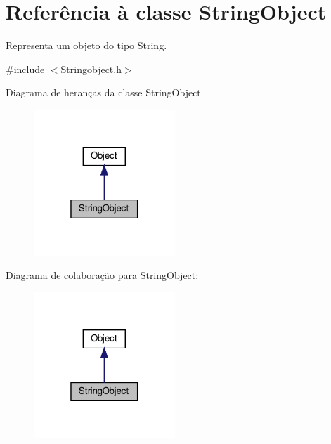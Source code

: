 \hypertarget{classStringObject}{}\section{Referência à classe String\+Object}
\label{classStringObject}


Representa um objeto do tipo String.  




{\ttfamily \#include $<$Stringobject.\+h$>$}



Diagrama de heranças da classe String\+Object\nopagebreak
\begin{figure}[H]
\begin{center}
\leavevmode
\includegraphics[width=151pt]{classStringObject__inherit__graph}
\end{center}
\end{figure}


Diagrama de colaboração para String\+Object\+:\nopagebreak
\begin{figure}[H]
\begin{center}
\leavevmode
\includegraphics[width=151pt]{classStringObject__coll__graph}
\end{center}
\end{figure}
